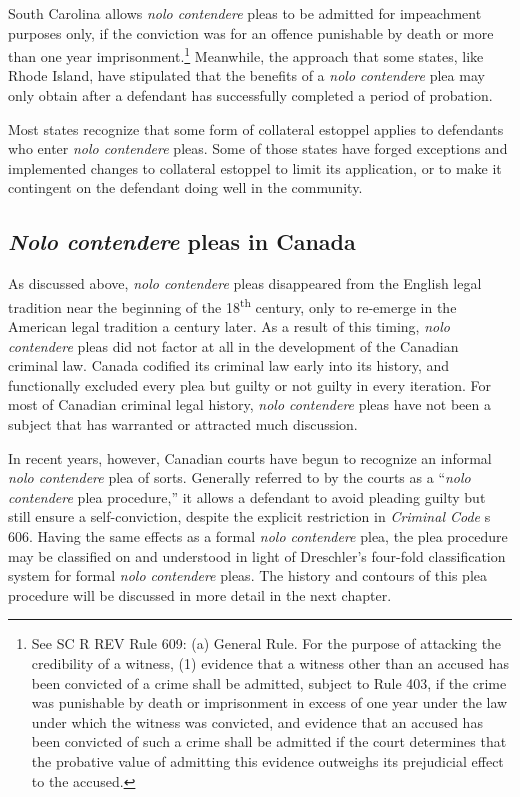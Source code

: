 South Carolina allows \textit{nolo contendere} pleas to be admitted for impeachment purposes only, if the conviction was for an offence punishable by death or more than one year imprisonment.\footnote{See SC R REV Rule 609: (a) General Rule. For the purpose of attacking the credibility of a witness, (1) evidence that a witness other than an accused has been convicted of a crime shall be admitted, subject to Rule 403, if the crime was punishable by death or imprisonment in excess of one year under the law under which the witness was convicted, and evidence that an accused has been convicted of such a crime shall be admitted if the court determines that the probative value of admitting this evidence outweighs its prejudicial effect to the accused.} Meanwhile, the approach that some states, like Rhode Island, have stipulated that the benefits of a \textit{nolo contendere} plea may only obtain after a defendant has successfully completed a period of probation.

Most states recognize that some form of collateral estoppel applies to defendants who enter \textit{nolo contendere} pleas. Some of those states have forged exceptions and implemented changes to collateral estoppel to limit its application, or to make it contingent on the defendant doing well in the community. 

\subsection{\textit{Nolo contendere} pleas in Canada}

As discussed above, \textit{nolo contendere} pleas disappeared from the English legal tradition near the beginning of the 18\textsuperscript{th} century, only to re-emerge in the American legal tradition a century later. As a result of this timing, \textit{nolo contendere} pleas did not factor at all in the development of the Canadian criminal law. Canada codified its criminal law early into its history, and functionally excluded every plea but guilty or not guilty in every iteration. For most of Canadian criminal legal history, \textit{nolo contendere} pleas have not been a subject that has warranted or attracted much discussion.

In recent years, however, Canadian courts have begun to recognize an informal \textit{nolo contendere} plea of sorts. Generally referred to by the courts as a ``\textit{nolo contendere} plea procedure,'' it allows a defendant to avoid pleading guilty but still ensure a self-conviction, despite the explicit restriction in \textit{Criminal Code} s 606. Having the same effects as a formal \textit{nolo contendere} plea, the plea procedure may be classified on and understood in light of Dreschler's four-fold classification system for formal \textit{nolo contendere} pleas. The history and contours of this plea procedure will be discussed in more detail in the next chapter.

